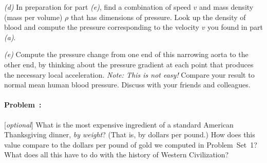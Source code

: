 \documentclass[12pt]{article}
\newcounter{problem}
\begin{document}
\textsl{(d)} In preparation for part \textsl{(e)}, find a combination
of speed $v$ and mass density (mass per volume) $\rho$ that has
dimensions of pressure.  Look up the density of blood and compute the
pressure corresponding to the velocity $v$ you found in
part \textsl{(a)}.

\textsl{(e)} Compute the pressure change from one end of this
narrowing aorta to the other end, by thinking about the pressure
gradient at each point that produces the necessary local acceleration.
\emph{Note: This is not easy!}  Compare your result to normal mean
human blood pressure.  Discuss with your friends and colleagues.

\paragraph{Problem~\theproblem:}%
[\textsl{optional}] What is the most expensive ingredient of a
standard American Thanksgiving dinner, \emph{by weight}?  (That is, by
dollars per pound.)  How does this value compare to the dollars per
pound of gold we computed in Problem~Set~1?  What does all this have
to do with the history of Western Civilization?
\end{document}
